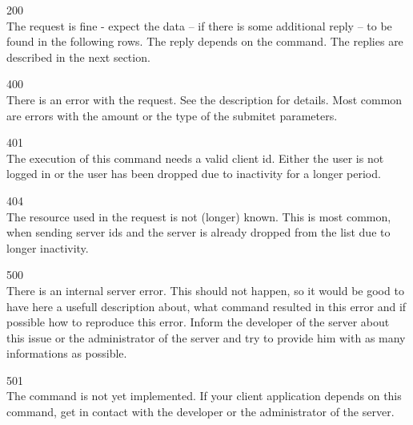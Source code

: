\documentclass[a4paper,10pt]{article}
\begin{document}
\begin{description}

\item 200 \\
The request is fine - expect the data -- if there is some additional reply --
to be found in the following rows. The reply depends on the command. The
replies are described in the next section.

\item 400 \\
There is an error with the request. See the description for details. Most
common are errors with the amount or the type of the submitet parameters.

\item 401 \\
The execution of this command needs a valid client id. Either the user is not
logged in or the user has been dropped due to inactivity for a longer period.

\item 404 \\
The resource used in the request is not (longer) known. This is most common,
when sending server ids and the server is already dropped from the list due to
longer inactivity.

\item 500 \\
There is an internal server error. This should not happen, so it would be good
to have here a usefull description about, what command resulted in this error
and if possible how to reproduce this error. Inform the developer of the
server about this issue or the administrator of the server and try to provide
him with as many informations as possible.

\item 501 \\
The command is not yet implemented. If your client application depends on this
command, get in contact with the developer or the administrator of the server.

\end{description}


\end{document}

